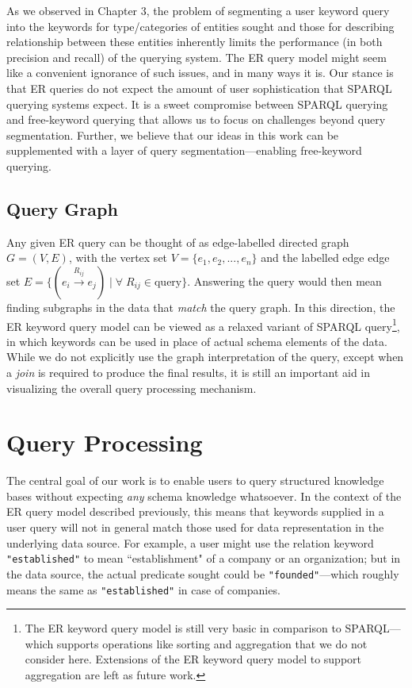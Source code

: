 \documentclass[a4paper, twoside, 12pt]{report}
\begin{document}
As we observed in Chapter 3, the problem of segmenting a user keyword query into the keywords for type/categories of entities sought and those for describing relationship between these entities inherently limits the performance (in both precision and recall) of the querying system. The ER query model might seem like a convenient ignorance of such issues, and in many ways it is. Our stance is that ER queries do not expect the amount of user sophistication that SPARQL querying systems expect. It is a sweet compromise between SPARQL querying and free-keyword querying that allows us to focus on challenges beyond query segmentation. Further, we believe that our ideas in this work can be supplemented with a layer of query segmentation---enabling free-keyword querying. 

\subsection{Query Graph}
Any given ER query can be thought of as edge-labelled directed graph $G = (V, E)$, with the vertex set $V = \{e_1, e_2, ..., e_n\}$ and the 
labelled edge edge set $E = \{(e_i \xrightarrow{R_{ij}} e_j) \; | \; \forall \; R_{ij} \in \text{query} \}$. Answering the query would then 
mean finding subgraphs in the data that \emph{match} the query graph. In this direction, the ER keyword query model can be viewed as a 
relaxed variant of SPARQL query\footnote{The ER keyword query model is still very basic in comparison to SPARQL---which supports operations like sorting and aggregation that we do not consider here. Extensions of the ER keyword query model to support aggregation are left as future work.}, in which keywords can be used in place of actual schema elements of the data. While we do not explicitly use the graph interpretation of the query, except when a \emph{join} is required to produce the final results, it is still an important aid in visualizing the overall query processing mechanism.

\section{Query Processing}

The central goal of our work is to enable users to query structured knowledge bases without expecting \emph{any} schema knowledge whatsoever. In the context of the ER query model described previously, this means that keywords supplied in a user query will not in general match those used for data representation in the underlying data source. For example, a user might use the relation keyword \texttt{"established"} to mean ``establishment" of a company or an organization; but in the data source, the actual predicate sought could be \texttt{"founded"}---which roughly means the same as \texttt{"established"} in case of companies. 
\end{document}
